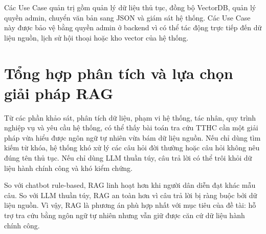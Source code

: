 Các Use Case quản trị gồm quản lý dữ liệu thủ tục, đồng bộ VectorDB,
quản lý quyền admin, chuyển văn bản sang JSON và giám sát hệ thống. Các
Use Case này được bảo vệ bằng quyền admin ở backend vì có thể tác động
trực tiếp đến dữ liệu nguồn, lịch sử hội thoại hoặc kho vector của hệ
thống.

\section{Tổng hợp phân tích và lựa chọn giải
pháp
RAG}

Từ các phần khảo sát, phân tích dữ liệu, phạm vi hệ thống, tác nhân, quy
trình nghiệp vụ và yêu cầu hệ thống, có thể thấy bài toán tra cứu TTHC
cần một giải pháp vừa hiểu được ngôn ngữ tự nhiên vừa bám dữ liệu nguồn.
Nếu chỉ dùng tìm kiếm từ khóa, hệ thống khó xử lý các câu hỏi đời thường
hoặc câu hỏi không nêu đúng tên thủ tục. Nếu chỉ dùng LLM thuần túy, câu
trả lời có thể trôi khỏi dữ liệu hành chính công và khó kiểm chứng.

So với chatbot rule-based, RAG linh hoạt hơn khi người dân diễn đạt khác
mẫu câu. So với LLM thuần túy, RAG an toàn hơn vì câu trả lời bị ràng
buộc bởi dữ liệu nguồn. Vì vậy, RAG là phương án phù hợp nhất với mục
tiêu của đề tài: hỗ trợ tra cứu bằng ngôn ngữ tự nhiên nhưng vẫn giữ
được căn cứ dữ liệu hành chính công.

